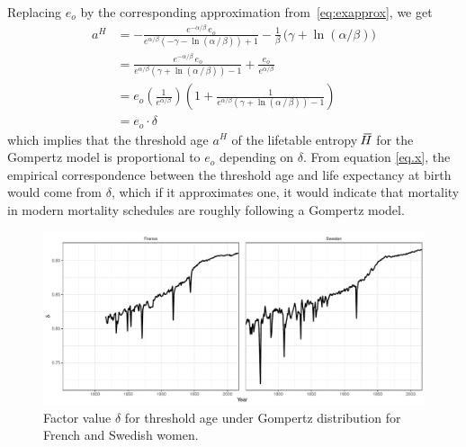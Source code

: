 \documentclass[a4paper,twoside, openright, 12pt, leqno]{article}
\newcommand*\xbar[1]{%
   \hbox{%
     \vbox{%
       \hrule height 0.5pt %
       \kern0.3ex%
       \hbox{%
         \kern-0.28em%
         \ensuremath{#1}%
         \kern-0.05em%
       }%
     }%
   }%
}
\begin{document}
Replacing $e_o$ by the corresponding approximation from~\eqref{eq:exapprox}, we get
\begin{equation}
  \begin{split}
 	a^H & = -\frac{e^{-\alpha/\beta}\,e_o}{e^{\alpha/\beta}\left(-\gamma-\ln\left(\alpha\,/\,\beta\right)\right)+1}-\frac{1}{\beta}\,\big(\gamma+\ln(\alpha/\beta)\big)				\\
 	& = \frac{e^{-\alpha/\beta}\,e_o}{e^{\alpha/\beta}( \gamma+\ln\left(\alpha\,/\,\beta\right))-1}+\frac{e_o}{e^{\alpha/\beta}} \\
 	 	& = e_o \left(\frac{1}{e^{\alpha/\beta}}\right) \left(1  + \frac{1}{e^{\alpha/\beta}( \gamma+\ln\left(\alpha\,/\,\beta\right)) -1} \right)   \; \\
 	 	 	 	& = e_o \cdot \delta
  \end{split}
  \label{eq.x}
\end{equation}
%
which implies that the threshold age $a^H$ of the lifetable entropy $\,\xbar{H}$ for the Gompertz model is proportional to $e_o$ depending on $\delta$. From equation \eqref{eq.x}, the empirical correspondence between the threshold age and life expectancy at birth would come from $\delta$, which if it approximates one, it would  indicate that mortality in modern mortality schedules are roughly following a Gompertz model.
\linebreak

\begin{figure}[h!]
\caption{Factor value $\delta$ for threshold age under Gompertz distribution for French and Swedish women.}
\centering
\includegraphics[scale=.5]{Figure_delta}
\end{figure}
\end{document}

